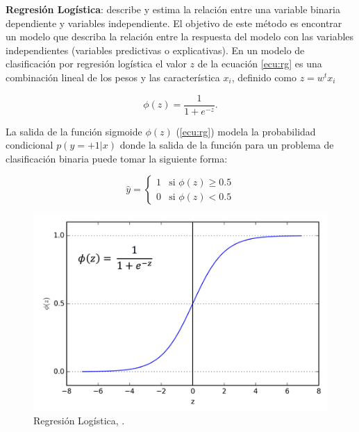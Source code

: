 \par \textbf{Regresión Logística}: describe y estima la relación entre una variable binaria dependiente y variables independiente. El objetivo de este método es encontrar un modelo que describa la relación entre la respuesta del modelo con las variables independientes (variables predictivas o explicativas). En un modelo de clasificación por regresión logística el valor $z$ de la ecuación \ref {ecu:rg} es una combinación lineal de los pesos y las característica $x_i$, definido como $z=w^t x_i$ 
   

\begin{equation}\label{ecu:rg}
\phi(z) = \frac{1}{1+e^{-z}}.
\end{equation}

La salida de la función sigmoide $\phi(z)$ (\ref {ecu:rg}) modela la probabilidad condicional $p(y=+1|x)$ donde la salida de la función para un problema de clasificación binaria puede tomar la siguiente forma:

\begin{equation}\label{ecu:f_sig_class}
\hat{y} = \left \{\begin{matrix} 1 & \mbox{si }\phi(z) \ge 0.5
\\ 0 & \mbox{si }\phi(z) < 0.5 \end{matrix}\right. 
\end{equation}


\begin{figure}[H]
 \centering
  \includegraphics[scale=0.5]{imagenes/MarcoTeorico/sigmoide.png}
  \caption{Regresión Logística, \citep{bishop}.}
  \label{Fig: log_reg}
\end{figure}


